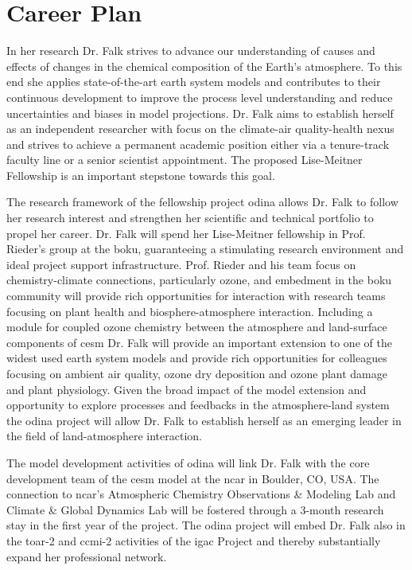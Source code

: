 \section{Career Plan}
\label{sec:career}
In her research Dr. Falk strives to advance our understanding of causes and effects of changes in the chemical composition of the Earth’s atmosphere. To this end she applies state-of-the-art earth system models and contributes to their continuous development to improve the process level understanding and reduce uncertainties and biases in model projections. Dr. Falk aims to establish herself as an independent researcher with focus on the climate-air quality-health nexus and strives to achieve a permanent academic position either via a tenure-track faculty line or a senior scientist appointment. The proposed Lise-Meitner Fellowship is an important stepstone towards this goal.

The research framework of the fellowship project \gls{odina} allows Dr. Falk to follow her research interest and strengthen her scientific and technical portfolio to propel her career. Dr. Falk will spend her Lise-Meitner fellowship in Prof. Rieder’s group at the \gls{boku}, guaranteeing a stimulating research environment and ideal project support infrastructure. Prof. Rieder and his team focus on chemistry-climate connections, particularly ozone, and embedment in the \gls{boku} community will provide rich opportunities for interaction with research teams focusing on plant health and biosphere-atmosphere interaction. Including a module for coupled ozone chemistry between the atmosphere and land-surface components of \gls{cesm} Dr. Falk will provide an important extension to one of the widest used earth system models and provide rich opportunities for colleagues focusing on ambient air quality, ozone dry deposition and ozone plant damage and plant physiology. Given the broad impact of the model extension and opportunity to explore processes and feedbacks in the atmosphere-land system the \gls{odina} project will allow Dr. Falk to establish herself as an emerging leader in the field of land-atmosphere interaction.

The model development activities of \gls{odina} will link Dr. Falk with the core development team of the \gls{cesm} model at the \gls{ncar} in Boulder, CO, USA. The connection to \gls{ncar}'s Atmospheric Chemistry Observations \& Modeling Lab and Climate \& Global Dynamics Lab will be fostered through a 3-month research stay in the first year of the project. The \gls{odina} project will embed Dr. Falk also in the \gls{toar}-2 and \gls{ccmi}-2 activities of the \gls{igac} Project and thereby substantially expand her professional network.

